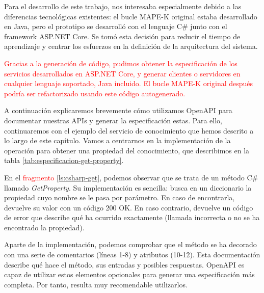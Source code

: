 Para el desarrollo de este trabajo, nos interesaba especialmente debido a las diferencias tecnológicas existentes: el bucle MAPE-K original estaba desarrollado en Java, pero el prototipo se desarrolló con el lenguaje C\# junto con el framework ASP.NET Core. Se tomó esta decisión para reducir el tiempo de aprendizaje y centrar los esfuerzos en la definición de la arquitectura del sistema.

\textcolor{red}{Gracias a la generación de código, pudimos obtener la especificación de los servicios desarrollados en ASP.NET Core, y generar clientes o servidores en cualquier lenguaje soportado, Java incluido. El bucle MAPE-K original después podría ser refactorizado usando este código autogenerado.}

A continuación explicaremos brevemente cómo utilizamos OpenAPI para documentar nuestras APIs y generar la especificación estas. Para ello, continuaremos con el ejemplo del servicio de conocimiento que hemos descrito a lo largo de este capítulo. Vamos a centrarnos en la implementación de la operación para obtener una propiedad del conocimiento, que describimos en la tabla \ref{tab:especificacion-get-property}.

En el \textcolor{red}{fragmento} \ref{ls:csharp-get}, podemos observar que se trata de un método C\# llamado \emph{GetProperty}. Su implementación es sencilla: busca en un diccionario la propiedad cuyo nombre se le pasa por parámetro. En caso de encontrarla, devuelve su valor con un código 200 OK. En caso contrario, devuelve un código de error que describe qué ha ocurrido exactamente (llamada incorrecta o no se ha encontrado la propiedad).

Aparte de la implementación, podemos comprobar que el método se ha decorado con una serie de comentarios (líneas 1-8) y atributos (10-12). Esta documentación describe qué hace el método, sus entradas y posibles respuestas. OpenAPI es capaz de utilizar estos elementos opcionales para generar una especificación más completa. Por tanto, resulta muy recomendable utilizarlos.

